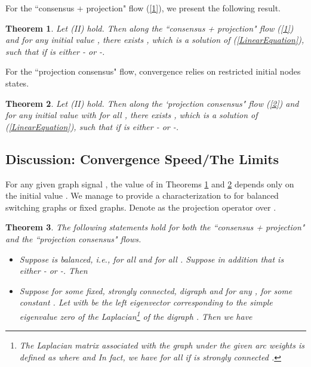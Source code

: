 \documentclass[a4paper, 11pt]{article}
\newtheorem{theorem}{Theorem}
\begin{document}
For the ``consensus + projection" flow (\ref{1}), we present the following result.


\begin{theorem}\label{thm3}
Let (II) hold. Then   along  the ``consensus + projection" flow (\ref{1}) and for any initial value , there exists  , which is a solution of (\ref{LinearEquation}), such that    if  is either  - or -.
\end{theorem}


For the ``projection consensus" flow, convergence relies on restricted initial nodes states.
\begin{theorem}\label{thm4}
Let (II) hold. Then   along  the `projection consensus" flow  (\ref{2}) and for any initial value  with  for all , there exists  , which is a solution of (\ref{LinearEquation}), such that    if  is either  - or -.
\end{theorem}

\subsection{Discussion: Convergence Speed/The Limits}


For any given graph signal , the value of  in Theorems \ref{thm3} and \ref{thm4}  depends only on the initial value . We manage to provide a characterization to   for balanced switching graphs or fixed graphs. Denote  as the projection operator over .

\begin{theorem}\label{prop1} The following statements hold for both the ``consensus + projection" and the ``projection consensus" flows.
\begin{itemize}
\item[(i)] Suppose  is balanced, i.e.,  for all  and  for all . Suppose in addition  that  is either  - or -. Then

\item[(ii)] Suppose  for some fixed, strongly connected, digraph  and for any ,  for some constant .  Let  with  be the left eigenvector  corresponding to the simple eigenvalue zero of the Laplacian\footnote{The Laplacian matrix  associated with the graph  under the given arc weights is defined as  where  and  In fact, we have  for all  if  is strongly connected \cite{magnusbook}.}  of the digraph .
Then we have


\end{itemize}
\end{theorem}
\end{document}

